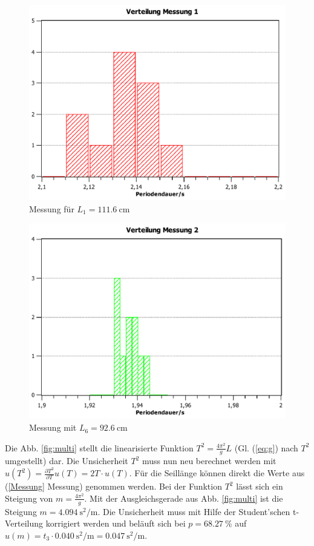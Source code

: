 \documentclass[11pt,a4paper,titlepage, ngerman]{article}
\begin{document}
		\begin{figure}[ht]
			\centering
			\includegraphics[width=\textwidth]{VerteilungMessung1.pdf}
			\caption{Messung für $L_1 = \SI{111,6}{\centi\meter}$}
			\label{fig:Hist1}
		\end{figure}
		\begin{figure}[ht]
			\centering
			\includegraphics[width=\textwidth]{VerteilungMessung2.pdf}
			\caption{Messung mit $L_6 = \SI{92,6}{\centi\meter}$}
			\label{fig:Hist2}
		\end{figure}
			
		Die Abb. \ref{fig:multi} stellt die linearisierte Funktion $T^2 = \frac{4 \pi^2}{g} L$ (Gl. (\ref{eq:g}) nach $T^2$ umgestellt) dar.
		Die Unsicherheit $T^2$ muss nun neu berechnet werden mit $u(T^2) = \frac{\partial T^2}{\partial T} u(T) = 2 T \cdot u(T)$.
		Für die Seillänge können direkt die Werte aus (\ref{Messung} Messung) genommen werden.
		Bei der Funktion $T^2$ lässt sich ein Steigung von $m = \frac{4 \pi^2}{g}$.
		Mit der Ausgleichsgerade aus Abb. \ref{fig:multi} ist die Steigung $m = \SI{4,094}{\second\squared\per\meter}$.
		Die Unsicherheit muss mit Hilfe der Student'schen t-Verteilung korrigiert werden und beläuft sich bei $p = \SI{68,27}{\%}$ auf $u(m) = t_3 \cdot \SI{0,040}{\second\squared\per\meter} = \SI{0,047}{\second\squared\per\meter}$.
		
\end{document}
